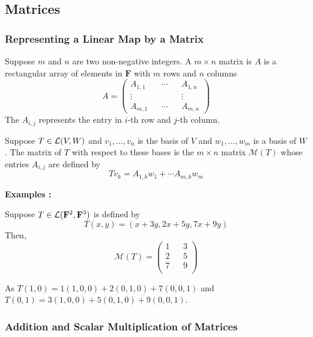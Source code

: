 \subsection{Matrices}

\subsubsection{Representing a Linear Map by a Matrix}

\begin{definition}
    Suppose $m$ and $n$ are two non-negative integers. A $m \times n$ matrix is $A$ is a rectangular array of elements in $\mathbf{F}$ 
    with $m$ rows and $n$ columns
    \[ A = \begin{pmatrix}
        A_{1,1} && \cdots && A_{1,n} \\
        \vdots && && \vdots \\
        A_{m,1} && \cdots && A_{m,n} 
    \end{pmatrix} \]
    The $A_{i,j}$ represents the entry in $i$-th row and $j$-th column.
\end{definition}

\begin{definition}
    Suppose $T \in \operatorname{\mathcal{L}}(V,W)$ and $v_1, \ldots, v_n$ is the basis of $V$ and $w_1, \ldots, w_m$ is a basis of $W$. The matrix of 
    $T$ with respect to these bases is the $m \times n$ matrix $\mathcal{M}(T)$ whose entries $A_{i,j}$ are defined by
    \[ Tv_k = A_{1,k} w_1 + \cdots A_{m,k} w_m \] 
\end{definition}

\textbf{Examples :}

\vspace{4mm}
Suppose $T \in \operatorname{\mathcal{L}}(\mathbf{F}^2, \mathbf{F}^3)$ is defined by 
\[ T(x,y) = (x+3y, 2x+5y, 7x+9y) \]
Then,
\[ \mathcal{M}(T) = \begin{pmatrix}
    1 && 3 \\
    2 && 5 \\
    7 && 9 \\
\end{pmatrix} \] 

As $T(1,0) = 1(1,0,0) + 2(0,1,0) + 7(0,0,1)$ and $T(0,1) = 3(1,0,0)+5(0,1,0)+9(0,0,1)$.


\subsubsection{Addition and Scalar Multiplication of Matrices}

